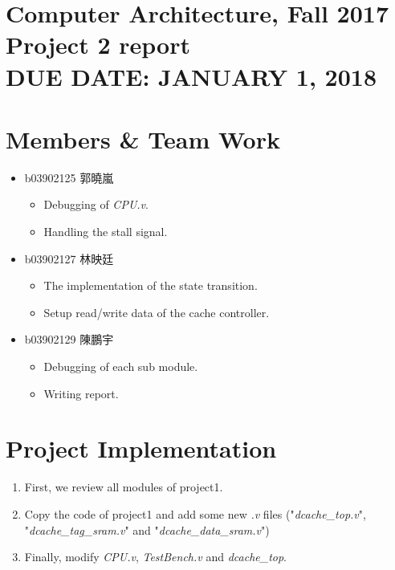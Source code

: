 \documentclass{article}
\newcommand{\hmwkClass}{Computer Architecture, Fall 2017}
\newcommand{\hmwkTitle}{Project 2 report}
\newcommand{\hmwkDueDate}{JANUARY 1, 2018}
\begin{document}
\thispagestyle{empty}
\section*{\hmwkClass \\
    \normalsize{\hmwkTitle} \\
    \normalsize{DUE DATE: \hmwkDueDate}
}

\section{Members \& Team Work} 
\begin{itemize}
    \item b03902125 郭曉嵐
    \begin{itemize}
        \item Debugging of \textit{CPU.v}.
        \item Handling the stall signal.
    \end{itemize}

    \item b03902127 林映廷
    \begin{itemize}
        \item The implementation of the state transition.
        \item Setup read/write data of the cache controller.
    \end{itemize}

    \item b03902129 陳鵬宇
    \begin{itemize}
        \item Debugging of each sub module.
        \item Writing report.
    \end{itemize}

\end{itemize}

\section{Project Implementation}
\begin{enumerate}
    \item First, we review all modules of project1. 
    \item Copy the code of project1 and add some new \textit{.v} files ("\textit{dcache\_top.v}", "\textit{dcache\_tag\_sram.v}" and "\textit{dcache\_data\_sram.v}")
    \item Finally, modify \textit{CPU.v}, \textit{TestBench.v} and \textit{dcache\_top}.
\end{enumerate}
\end{document}
